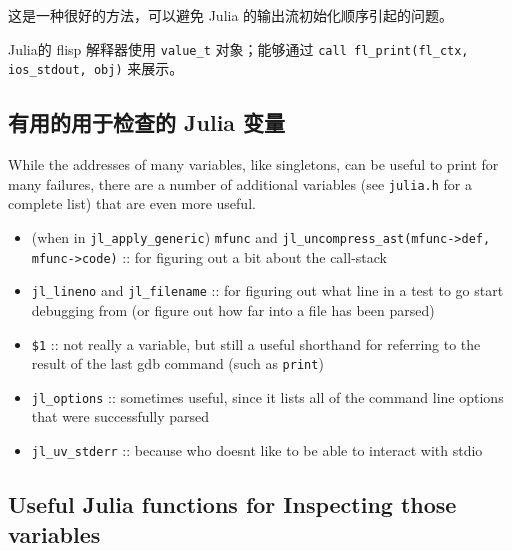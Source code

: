 这是一种很好的方法，可以避免 Julia 的输出流初始化顺序引起的问题。



Julia的 flisp 解释器使用 \texttt{value\_t} 对象；能够通过  \texttt{call fl\_print(fl\_ctx, ios\_stdout, obj)} 来展示。



\hypertarget{1284180401016634793}{}


\subsection{有用的用于检查的 Julia 变量}



While the addresses of many variables, like singletons, can be useful to print for many failures, there are a number of additional variables (see \texttt{julia.h} for a complete list) that are even more useful.



\begin{itemize}
\item (when in \texttt{jl\_apply\_generic}) \texttt{mfunc} and \texttt{jl\_uncompress\_ast(mfunc->def, mfunc->code)} :: for figuring out a bit about the call-stack


\item \texttt{jl\_lineno} and \texttt{jl\_filename} :: for figuring out what line in a test to go start debugging from (or figure out how far into a file has been parsed)


\item \texttt{\$1} :: not really a variable, but still a useful shorthand for referring to the result of the last gdb command (such as \texttt{print})


\item \texttt{jl\_options} :: sometimes useful, since it lists all of the command line options that were successfully parsed


\item \texttt{jl\_uv\_stderr} :: because who doesn{\textquotesingle}t like to be able to interact with stdio

\end{itemize}


\hypertarget{7178558395386377758}{}


\subsection{Useful Julia functions for Inspecting those variables}



